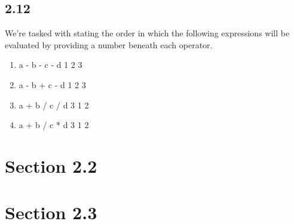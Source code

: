 \documentclass[leqno, 11pt]{article}
\begin{document}
\subsection*{2.12}
We're tasked with stating the order in which the following expressions will be evaluated by providing a number beneath each operator.
\begin{enumerate}[label=\alph*.]
  \item \begin{verbbox}
a - b - c - d
  1   2   3
        \end{verbbox}
        \theverbbox
  \item \begin{verbbox}
a - b + c - d
  1   2   3
        \end{verbbox}
        \theverbbox
  \item \begin{verbbox}
a + b / c / d
  3   1   2
        \end{verbbox}
        \theverbbox
  \item \begin{verbbox}
a + b / c * d
  3   1   2
        \end{verbbox}
        \theverbbox
\end{enumerate}
\section*{Section 2.2}
\section*{Section 2.3}
\end{document}
